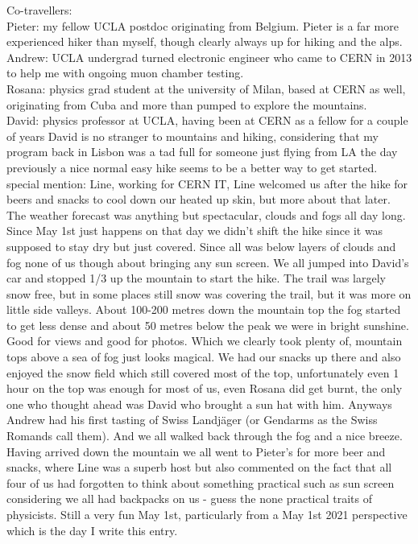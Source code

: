 Co-travellers:\\
Pieter: my fellow UCLA postdoc originating from Belgium. Pieter is a far more experienced hiker than myself, though clearly always up for hiking and the alps.\\
Andrew: UCLA undergrad turned electronic engineer who came to CERN in 2013 to help me with ongoing muon chamber testing.\\
Rosana: physics grad student at the university of Milan, based at CERN as well, originating from Cuba and more than pumped to explore the mountains.\\
David: physics professor at UCLA, having been at CERN as a fellow for a couple of years David is no stranger to mountains and hiking, considering that my program back in Lisbon was a tad full for someone just flying from LA the day previously a nice normal easy hike seems to be a better way to get started.\\
special mention: Line, working for CERN IT, Line welcomed us after the hike for beers and snacks to cool down our heated up skin, but more about that later.\\

The weather forecast was anything but spectacular, clouds and fogs all day long. Since May 1st just happens on that day we didn't shift the hike since it was supposed to stay dry but just covered. Since all was below layers of clouds and fog none of us though about bringing any sun screen. We all jumped into David's car and stopped 1/3 up the mountain to start the hike. The trail was largely snow free, but in some places still snow was covering the trail, but it was more on little side valleys. About 100-200 metres down the mountain top the fog started to get less dense and about 50 metres below the peak we were in bright sunshine. Good for views and good for photos. Which we clearly took plenty of, mountain tops above a sea of fog just looks magical. We had our snacks up there and also enjoyed the snow field which still covered most of the top, unfortunately even 1 hour on the top was enough for most of us, even Rosana did get burnt, the only one who thought ahead was David who brought a sun hat with him. Anyways Andrew had his first tasting of Swiss Landj\"ager (or Gendarms as the Swiss Romands call them). And we all walked back through the fog and a nice breeze. \\
Having arrived down the mountain we all went to Pieter's for more beer and snacks, where Line was a superb host but also commented on the fact that all four of us had forgotten to think about something practical such as sun screen considering we all had backpacks on us - guess the none practical traits of physicists. Still a very fun May 1st, particularly from a May 1st 2021 perspective which is the day I write this entry.\\


